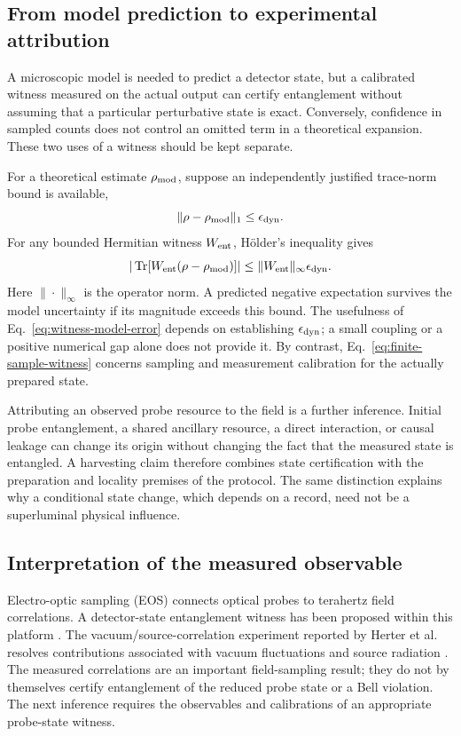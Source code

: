 \documentclass[pdflatex,sn-mathphys-num]{sn-jnl}
\newcommand{\Tr}{\operatorname{Tr}}
\begin{document}
\subsection{From model prediction to experimental attribution}
A microscopic model is needed to predict a detector state, but a calibrated witness measured on the actual output can certify entanglement without assuming that a particular perturbative state is exact. Conversely, confidence in sampled counts does not control an omitted term in a theoretical expansion. These two uses of a witness should be kept separate.

For a theoretical estimate $\rho_{\rm mod}$, suppose an independently justified trace-norm bound is available,
\begin{equation}
\|\rho-\rho_{\rm mod}\|_1\leq\epsilon_{\rm dyn}.
\label{eq:dynamical-error-budget}
\end{equation}
For any bounded Hermitian witness $W_{\rm ent}$, H\"older's inequality gives
\begin{equation}
|\Tr[W_{\rm ent}(\rho-\rho_{\rm mod})]|
\leq\|W_{\rm ent}\|_\infty\epsilon_{\rm dyn}.
\label{eq:witness-model-error}
\end{equation}
Here $\|\cdot\|_\infty$ is the operator norm. A predicted negative expectation survives the model uncertainty if its magnitude exceeds this bound. The usefulness of Eq.~\eqref{eq:witness-model-error} depends on establishing $\epsilon_{\rm dyn}$; a small coupling or a positive numerical gap alone does not provide it. By contrast, Eq.~\eqref{eq:finite-sample-witness} concerns sampling and measurement calibration for the actually prepared state.

Attributing an observed probe resource to the field is a further inference. Initial probe entanglement, a shared ancillary resource, a direct interaction, or causal leakage can change its origin without changing the fact that the measured state is entangled. A harvesting claim therefore combines state certification with the preparation and locality premises of the protocol. The same distinction explains why a conditional state change, which depends on a record, need not be a superluminal physical influence.

\subsection{Interpretation of the measured observable}
Electro-optic sampling (EOS) connects optical probes to terahertz field correlations. A detector-state entanglement witness has been proposed within this platform \cite{Lindel2024}. The vacuum/source-correlation experiment reported by Herter et al. resolves contributions associated with vacuum fluctuations and source radiation \cite{Herter2026VacuumSource}. The measured correlations are an important field-sampling result; they do not by themselves certify entanglement of the reduced probe state or a Bell violation. The next inference requires the observables and calibrations of an appropriate probe-state witness.
\end{document}
